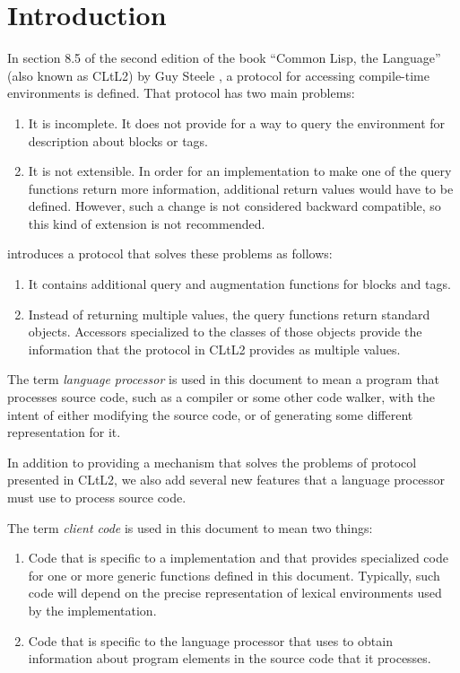 \chapter{Introduction}
%

In section 8.5 of the second edition of the book ``Common Lisp, the
Language'' (also known as CLtL2) by Guy Steele
\cite{Steele:1990:CLL:95411}, a protocol for accessing compile-time
environments is defined.  That protocol has two main problems:

\begin{enumerate}
\item It is incomplete.  It does not provide for a way to query the
  environment for description about blocks or tags.
\item It is not extensible.  In order for an implementation to make
  one of the query functions return more information, additional
  return values would have to be defined.  However, such a change is
  not considered backward compatible, so this kind of extension is not
  recommended.
\end{enumerate}

\sysname{} introduces a protocol that solves these problems as
follows:

\begin{enumerate}
\item It contains additional query and augmentation functions for
  blocks and tags.
\item Instead of returning multiple values, the query functions return
  standard objects.  Accessors specialized to the classes of those
  objects provide the information that the protocol in CLtL2
  provides as multiple values.
\end{enumerate}

The term \emph{language processor} is used in this document to mean a
program that processes source code, such as a compiler or some other
code walker, with the intent of either modifying the source code, or
of generating some different representation for it.

In addition to providing a mechanism that solves the problems of
protocol presented in CLtL2, we also add several new features that
a language processor must use to process source code.

The term \emph{client code} is used in this document to mean two
things:

\begin{enumerate}
\item Code that is specific to a \commonlisp{} implementation and that
  provides specialized code for one or more generic functions defined
  in this document.  Typically, such code will depend on the precise
  representation of lexical environments used by the implementation.
\item Code that is specific to the language processor that uses
  \sysname{} to obtain information about program elements in the
  source code that it processes.
\end{enumerate}

